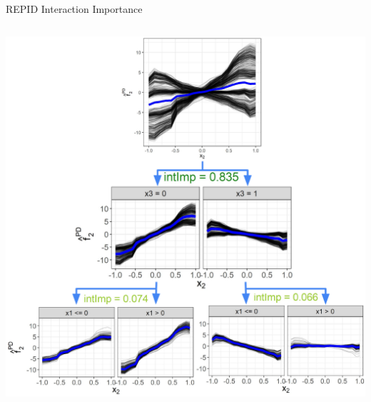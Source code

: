 \documentclass[10pt,compress,t,notes=noshow, xcolor=table]{beamer}
\begin{document}
\begin{frame}{REPID Interaction Importance}
\begin{columns}[T, totalwidth=\textwidth]
\begin{column}{0.54\textwidth}
    \centering
    \includegraphics[width=\textwidth]{figure/sim1}
    

\end{column}
\end{columns}
\end{frame}
\end{document}
